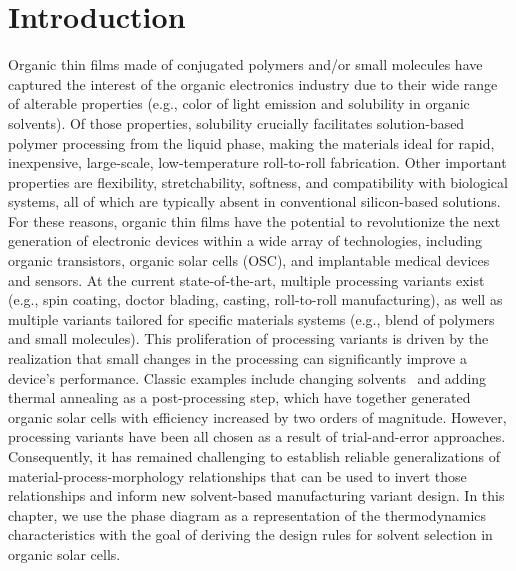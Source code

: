\section{Introduction}
Organic thin films made of conjugated polymers and/or small molecules have captured the interest of the organic electronics industry due to their wide range of alterable properties (e.g., color of light emission and solubility in organic solvents). 
Of those properties, solubility crucially facilitates solution-based polymer processing from the liquid phase, making the materials ideal for rapid, inexpensive, large-scale, low-temperature roll-to-roll fabrication. 
Other important properties are flexibility, stretchability, softness, and compatibility with biological systems, all of which are typically absent in conventional silicon-based solutions. 
For these reasons, organic thin films have the potential to revolutionize the next generation of electronic devices within a wide array of technologies, including organic transistors, organic solar cells (OSC), and implantable medical devices and sensors.
At the current state-of-the-art, multiple processing variants exist (e.g., spin coating, doctor blading, casting, roll-to-roll manufacturing), as well as multiple variants tailored for specific materials systems (e.g., blend of polymers and small molecules).  
This proliferation of processing variants is driven by the realization that small changes in the processing can significantly improve a device's performance. 
Classic examples include changing solvents~\cite{Shaheen2001} and adding thermal annealing as a post-processing step, which have together generated organic solar cells with efficiency increased by two orders of magnitude. 
However, processing variants have been all chosen as a result of trial-and-error approaches. 
Consequently, it has remained challenging to establish reliable generalizations of material-process-morphology relationships that can be used to invert those relationships and inform new solvent-based manufacturing variant design.
In this chapter, we use the phase diagram as a representation of the thermodynamics characteristics with the goal of deriving the design rules for solvent selection in organic solar cells. 

